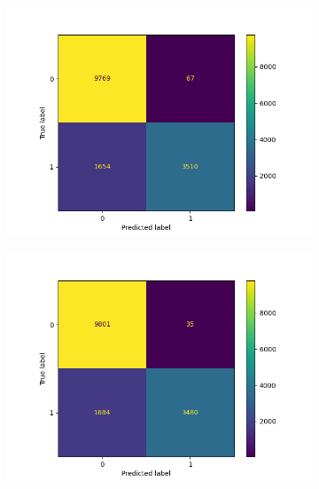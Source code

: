 \begin{figure}
\begin{subfigure}[b]{0.245\textwidth}
            \centering 
            \includegraphics[scale=0.35]{"../figs/fig_content_title/fig_ngramKNN_3k=7_content_title.png"}
            \caption{}
        \end{subfigure}
        \begin{subfigure}[b]{0.245\textwidth}
            \centering
            \includegraphics[scale=0.35]{"../figs/fig_content_title/fig_ngramKNN_3k=10_content_title.png"}
            \subcaption{}
        \end{subfigure}
        \begin{subfigure}[b]{0.245\textwidth}
            \centering

\end{subfigure}
\end{figure}
